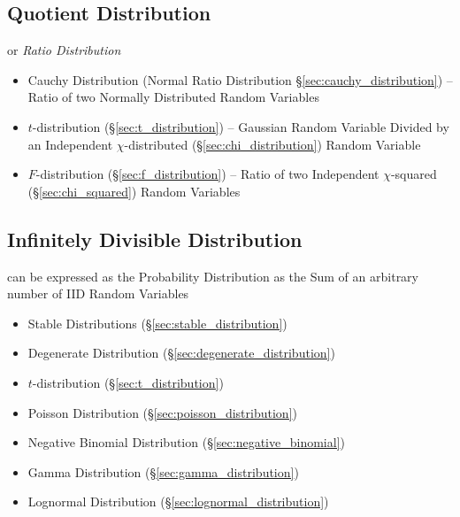 \subsection{Quotient Distribution}\label{sec:quotient_distribution}

or \emph{Ratio Distribution}

\begin{itemize}
  \item Cauchy Distribution (Normal Ratio Distribution
    \S\ref{sec:cauchy_distribution}) -- Ratio of two Normally Distributed Random
    Variables
  \item $t$-distribution (\S\ref{sec:t_distribution}) -- Gaussian Random
    Variable Divided by an Independent $\chi$-distributed
    (\S\ref{sec:chi_distribution}) Random Variable
  \item $F$-distribution (\S\ref{sec:f_distribution}) -- Ratio of two
    Independent $\chi$-squared (\S\ref{sec:chi_squared}) Random Variables
\end{itemize}



\subsection{Infinitely Divisible Distribution}
\label{sec:infinitely_divisible}

can be expressed as the Probability Distribution as the Sum of an arbitrary
number of IID Random Variables

\begin{itemize}
  \item Stable Distributions (\S\ref{sec:stable_distribution})
  \item Degenerate Distribution (\S\ref{sec:degenerate_distribution})
  \item $t$-distribution (\S\ref{sec:t_distribution})
  \item Poisson Distribution (\S\ref{sec:poisson_distribution})
  \item Negative Binomial Distribution (\S\ref{sec:negative_binomial})
  \item Gamma Distribution (\S\ref{sec:gamma_distribution})
  \item Lognormal Distribution (\S\ref{sec:lognormal_distribution})
\end{itemize}



